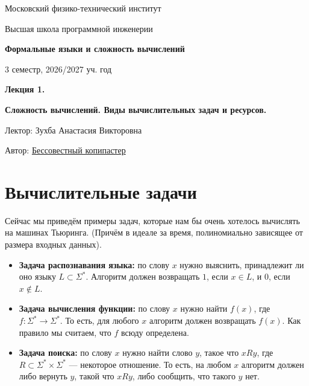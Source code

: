 \documentclass[11pt]{article}
\newcommand{\semester}{3 семестр, 2026/2027 уч. год}
\begin{document}
\begin{titlepage}
    \centering
    
    {\large Московский физико-технический институт \par}
    {\large Высшая школа программной инженерии \par}
    \vspace{2cm}

    {\Large \textbf{Формальные языки и сложность вычислений} \par}
    {\large \semester \par}
    
    \vspace*{\fill}

    {\Huge \textbf{Лекция 1. } \par}
    {\Huge \textbf{Сложность вычислений. Виды вычислительных задач и ресурсов.} \par}
    
    \vspace*{\fill}
    
    {\large Лектор: Зухба Анастасия Викторовна \par}
    {\large Автор: \href{https://t.me/lost_luna}{Бессовестный копипастер} \par}

\end{titlepage}


\section{Вычислительные задачи}

Сейчас мы приведём примеры задач, которые нам бы очень хотелось вычислять на машинах Тьюринга. (Причём в идеале за время, полиномиально
зависящее от размера входных данных).

\begin{itemize}
    \item \textbf{Задача распознавания языка:} по слову $x$ нужно выяснить, принадлежит ли оно языку $L \subset \Sigma^*$. Алгоритм должен возвращать
    $1$, если $x \in L$, и $0$, если $x \notin L$.

    \item \textbf{Задача вычисления функции:} по слову $x$ нужно найти $f(x)$, где $f: \Sigma^* \to \Sigma^*$. То есть, для любого $x$ 
    алгоритм должен возвращать $f(x)$. Как правило мы считаем, что $f$ всюду определена.

    \item \textbf{Задача поиска:} по слову $x$ нужно найти слово $y$, такое что $x R y$, где $R \subset \Sigma^* \times \Sigma^*$ --- некоторое
    отношение. То есть, на любом $x$ алгоритм должен либо вернуть $y$, такой что $x R y$, либо сообщить, что такого $y$ нет.
\end{itemize}
\end{document}
